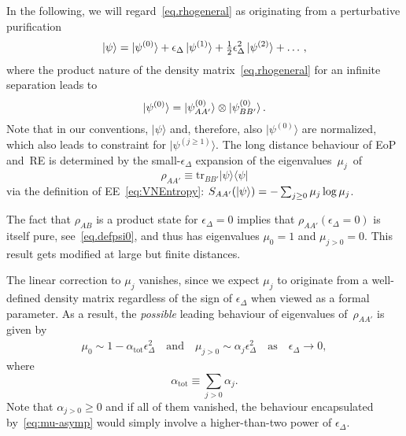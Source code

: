 \documentclass[prl,a4paper,notitlepage,twocolumn,superscriptaddress,longbibliography,reprint]{revtex4-2}
\newcommand{\ie}{{\it i.e.},\ }
\begin{document}
In the following, we will regard~\eqref{eq.rhogeneral} as originating from a perturbative purification
\begin{align}
\label{eq.defpertpuri}
    \ket{\psi}=\ket{\psi^{(0)}}+\epsilon_\Delta \ket{\psi^{(1)}}+\tfrac{1}{2}\epsilon^2_\Delta \ket{\psi^{(2)}}+\dots\,,
\end{align}
where the product nature of the density matrix~\eqref{eq.rhogeneral} for an infinite separation leads to
\begin{equation}
\label{eq.defpsi0}
\ket{\psi^{(0)}}=\ket{\psi^{(0)}_{AA'}}\otimes\ket{\psi^{(0)}_{BB'}}.
\end{equation}
Note that in our conventions, $|\psi\rangle$ and, therefore, also $|\psi^{(0)}\rangle$ are normalized, which also leads to constraint for $|\psi^{(j\geq 1)}\rangle$. The long distance behaviour of EoP and~RE is determined by the small-$\epsilon_{\Delta}$ expansion of the eigenvalues~$\mu_{j}$~of
\begin{equation}
\rho_{AA'} \equiv \mathrm{tr}_{BB'} |\psi\rangle \langle \psi|
\end{equation}
via the definition of EE~\eqref{eq:VNEntropy}: $S_{AA'}(\ket{\psi})=-\sum_{j\geq 0}\mu_j\log{\mu_j}$.

The fact that $\rho_{AB}$ is a product state for $\epsilon_{\Delta}=0$ implies that $\rho_{AA'}(\epsilon_{\Delta}=0)$ %
is itself pure, see~\eqref{eq.defpsi0}, and thus has eigenvalues $\mu_{0} = 1$ and $\mu_{j>0} = 0$. This result gets modified at large but finite distances. 

The linear correction to $\mu_j$ vanishes, since we expect $\mu_j$ to originate from a well-defined density matrix regardless of the sign of $\epsilon_{\Delta}$ when viewed as a formal parameter. As a result, the \emph{possible} leading behaviour of eigenvalues of~$\rho_{AA'}$ is given by
\small
\begin{align}
\mu_{0}\sim 1-\alpha_{\mathrm{tot}} \epsilon_{\Delta}^2\quad\text{and}\quad \mu_{j>0}\sim \alpha_j\epsilon_{\Delta}^2\quad\text{as}\quad\epsilon_\Delta\to0,\label{eq:mu-asymp}
\end{align}
\normalsize
where 
\begin{equation}
\label{eq.defalphatot}
\alpha_{\text{tot}} \equiv \sum_{j>0} \alpha_{j}.
\end{equation}
Note that $\alpha_{j>0} \geq 0$ and if all of them vanished, the behaviour encapsulated by~\eqref{eq:mu-asymp} would simply involve a higher-than-two power of $\epsilon_{\Delta}$.
\end{document}

